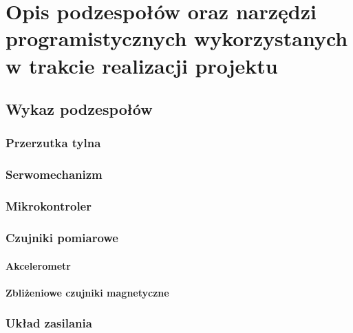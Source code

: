 \chapter{Opis podzespołów oraz narzędzi programistycznych wykorzystanych w trakcie realizacji projektu}
\section{Wykaz podzespołów}
\subsection{Przerzutka tylna}
\subsection{Serwomechanizm}
\subsection{Mikrokontroler}
\subsection{Czujniki pomiarowe}
\subsubsection{Akcelerometr}
\subsubsection{Zbliżeniowe czujniki magnetyczne}
\subsection{Układ zasilania}
